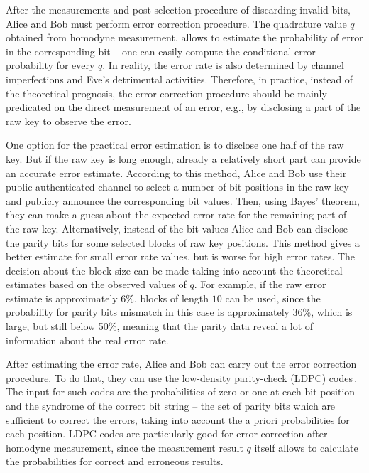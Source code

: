 \documentclass[a4paper]{article}
\begin{document}
After the measurements and post-selection procedure of discarding invalid bits, Alice and Bob must perform error correction procedure.
The quadrature value $q$ obtained from homodyne measurement, allows to estimate the probability of error in the corresponding bit -- one can easily compute the conditional error probability for every $q$.
In reality, the error rate is also determined by channel imperfections and Eve's detrimental activities.
Therefore, in practice, instead of the theoretical prognosis, the error correction procedure should be mainly predicated on the direct measurement of an error, e.g., by disclosing a part of the raw key to observe the error.

One option for the practical error estimation is to disclose one half of the raw key. 
But if the raw key is long enough, already a relatively short part can provide an accurate error estimate. 
According to this method, Alice and Bob use their public authenticated channel to select a number of bit positions in the raw key and publicly announce the corresponding bit values. 
Then, using Bayes' theorem, they can make a guess about the expected error rate for the remaining part of the raw key.
Alternatively, instead of the bit values Alice and Bob can disclose the parity bits for some selected blocks of raw key positions. 
This method gives a better estimate for small error rate values, but is worse for high error rates. 
The decision about the block size can be made taking into account the theoretical estimates based on the observed values of $q$. 
For example, if the raw error estimate is approximately 6\%, blocks of length $10$ can be used, since the probability for parity bits mismatch in this case is approximately 36\%, which is large, but still below 50\%, meaning that the parity data reveal a lot of information about the real error rate. %

After estimating the error rate, Alice and Bob can carry out the error correction procedure. 
To do that, they can use the low-density parity-check (LDPC) codes\,\cite{MacKay}.
The input for such codes are the probabilities of zero or one at each bit position and the syndrome of the correct bit string -- the set of parity bits which are sufficient to correct the errors, taking into account the a priori probabilities for each position. 
LDPC codes are particularly good for error correction after homodyne measurement, since the measurement result $q$ itself allows to calculate the probabilities for correct and erroneous results.
\end{document}
